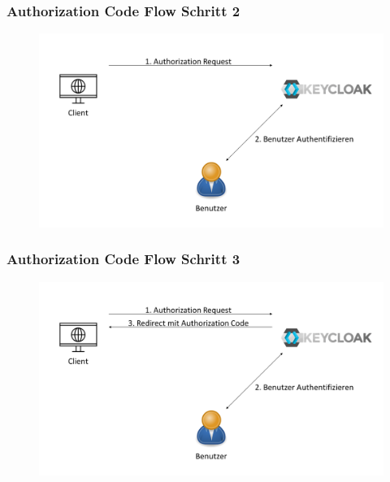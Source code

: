 \documentclass{beamer}
\begin{document}
\begin{frame}
\frametitle{Authorization Code Flow Schritt 2}
\begin{figure}
\centerfloat
\includegraphics[width=1.1\linewidth]{img/authflow2.png}
\end{figure}
\end{frame}

\begin{frame}
\frametitle{Authorization Code Flow Schritt 3}
\begin{figure}
\centerfloat
\includegraphics[width=1.1\linewidth]{img/authflow3.png}
\end{figure}
\end{frame}
\end{document}
